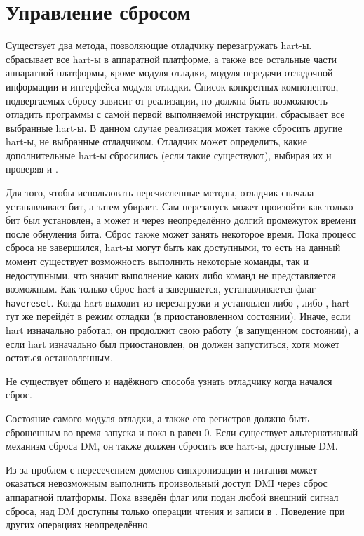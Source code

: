 \section{Управление сбросом} \label{reset}

Существует два метода, позволяющие отладчику перезагружать hart-ы.
\FdmDmcontrolNdmreset сбрасывает все hart-ы в аппаратной платформе, а также все остальные
части аппаратной платформы, кроме модуля отладки, модуля передачи отладочной информации
и интерфейса модуля отладки.
Список конкретных компонентов, подвергаемых сбросу зависит от реализации, но должна
быть возможность отладить программы с самой первой выполняемой инструкции.
\FdmDmcontrolHartreset сбрасывает все выбранные hart-ы. В данном случае
реализация может также сбросить другие hart-ы, не выбранные отладчиком.
Отладчик может определить, какие дополнительные hart-ы сбросились (если такие существуют), выбирая их
и проверяя \FdmDmstatusAnyhavereset и \FdmDmstatusAllhavereset.

Для того, чтобы использовать перечисленные методы, отладчик сначала устанавливает бит, а затем
убирает. Сам перезапуск может произойти как только бит был установлен, а
может и через неопределённо долгий промежуток времени после обнуления бита. Сброс
также может занять некоторое время.  Пока процесс сброса не завершился,
hart-ы могут быть как доступными, то есть на данный момент существует возможность
выполнить некоторые команды, так и недоступными,
что значит выполнение каких либо команд не представляется возможным.
Как только сброс hart-а завершается, устанавливается флаг {\tt havereset}.  Когда hart выходит
из перезагрузки и установлен либо \FdmDmcontrolHaltreq, либо \Fresethaltreq, hart тут же
перейдёт в режим отладки (в приостановленном состоянии).
Иначе, если hart изначально работал, он продолжит свою работу (в запущенном состоянии),
а если hart изначально был приостановлен, он должен запуститься, хотя может остаться остановленным.

\begin{commentary}
    Не существует общего и надёжного способа узнать отладчику когда начался
    сброс.
\end{commentary}

Состояние самого модуля отладки, а также его регистров должно быть
сброшенным во время запуска и пока
\FdmDmcontrolDmactive в \RdmDmcontrol равен 0. Если существует альтернативный механизм
сброса DM, он также должен сбросить все hart-ы, доступные
DM.

Из-за проблем с пересечением доменов синхронизации и питания
может оказаться невозможным выполнить произвольный доступ DMI
через сброс аппаратной платформы.
Пока взведён флаг \FdmDmcontrolNdmreset или подан любой внешний сигнал сброса, над DM
доступны только операции чтения и записи в \RdmDmcontrol. Поведение при других операциях
неопределённо.

